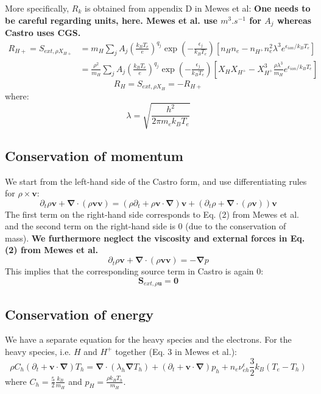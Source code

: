 \documentclass[11pt, oneside]{article}   	%
\begin{document}
More specifically, $R_k$ is obtained from appendix D in Mewes et al:
\textbf{One needs to be careful regarding units, here. Mewes et al. use $m^3.s^{-1}$ for $A_j$ whereas Castro uses CGS.}
\begin{align}
R_{H+} = S_{ext, \rho X_{H+} } &= m_H \sum_j A_j \left( \frac{k_BT_e}{e} \right)^{q_j}\exp\left( - \frac{\epsilon_j}{k_B T_e} \right)\left[ n_H n_e - n_{H^+}n_e^2 \lambda^3 e^{\epsilon_{ion}/k_BT_e} \right] \\
&= \frac{\rho^2}{m_H}\sum_j A_j \left( \frac{k_BT_e}{e} \right)^{q_j}\exp\left( - \frac{\epsilon_j}{k_B T_e} \right)\left[ X_H X_{H^+} - X_{H^+}^3 \frac{\rho \lambda^3}{m_H} e^{\epsilon_{ion}/k_BT_e} \right]
\end{align}
\[ R_H = S_{ext, \rho X_{H} } = -R_{H+} \]
where: \[ \lambda = \sqrt{\frac{h^2}{2\pi m_e k_B T_e} } \]

\subsection{Conservation of momentum}

We start from the left-hand side of the Castro form, and use differentiating rules for $\rho \times \boldsymbol{v}$:
\[
\partial_t \rho \boldsymbol{v} + \boldsymbol{\nabla}\cdot(\rho \boldsymbol{v} \boldsymbol{v}) = (\rho\partial_t + \rho \boldsymbol{v}\cdot\boldsymbol{\nabla}) \boldsymbol{v} + (\partial_t \rho + \boldsymbol{\nabla}\cdot(\rho \boldsymbol{v} ) ) \boldsymbol{v}
\]
The first term on the right-hand side corresponds to Eq. (2) from Mewes et al. and the second term on the right-hand side is 0 (due to the conservation of mass). \textbf{We furthermore neglect the viscosity and external forces in Eq. (2) from Mewes et al.}
\[ \partial_t \rho \boldsymbol{v} + \boldsymbol{\nabla}\cdot(\rho \boldsymbol{v} \boldsymbol{v}) = -\boldsymbol{\nabla}p \]
This implies that the corresponding source term in Castro is again 0:
\[ \boldsymbol{S}_{ext,\rho\boldsymbol{u}} = \boldsymbol{0} \]

\subsection{Conservation of energy}

We have a separate equation for the heavy species and the electrons. For the heavy species, i.e. $H$ and $H^+$ together (Eq. 3 in Mewes et al.):
\[ \rho C_h (\partial_t + \boldsymbol{v}\cdot\boldsymbol{\nabla})T_h = \boldsymbol{\nabla}\cdot(\lambda_h\boldsymbol{\nabla}T_h) + (\partial_t + \boldsymbol{v}\cdot\boldsymbol{\nabla})p_h + n_e\nu_{eh}^\epsilon \frac{3}{2} k_B(T_e - T_h) \]
where $C_h = \frac{5}{2}\frac{k_B}{m_H}$ and $p_H = \frac{\rho k_B T_h}{m_H}$.
\end{document}

